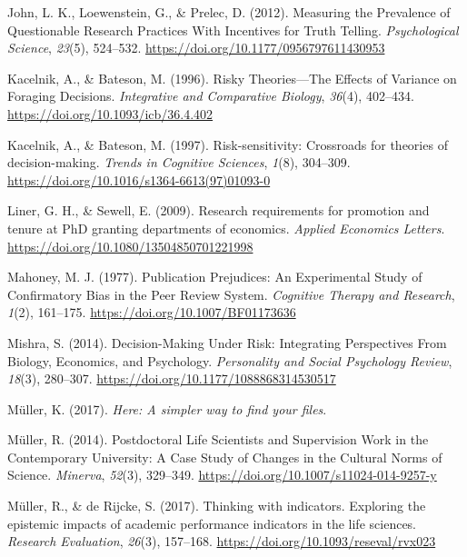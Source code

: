 \documentclass[
  ,man,mask,floatsintext]{apa6}
\newlength{\cslhangindent}
\newlength{\cslentryspacingunit} %
\newenvironment{CSLReferences}[2] %
 {%
  \setlength{\parindent}{0pt}
  \ifodd #1
  \let\oldpar\par
  \def\par{\hangindent=\cslhangindent\oldpar}
  \fi
  \setlength{\parskip}{#2\cslentryspacingunit}
 }%
 {}
\begin{document}
\begin{CSLReferences}{1}{0}
\leavevmode{}%
John, L. K., Loewenstein, G., \& Prelec, D. (2012). Measuring the {Prevalence} of {Questionable Research Practices With Incentives} for {Truth Telling}. \emph{Psychological Science}, \emph{23}(5), 524--532. \url{https://doi.org/10.1177/0956797611430953}

\leavevmode{}%
Kacelnik, A., \& Bateson, M. (1996). Risky {Theories}---{The Effects} of {Variance} on {Foraging Decisions}. \emph{Integrative and Comparative Biology}, \emph{36}(4), 402--434. \url{https://doi.org/10.1093/icb/36.4.402}

\leavevmode{}%
Kacelnik, A., \& Bateson, M. (1997). Risk-sensitivity: Crossroads for theories of decision-making. \emph{Trends in Cognitive Sciences}, \emph{1}(8), 304--309. \url{https://doi.org/10.1016/s1364-6613(97)01093-0}

\leavevmode{}%
Liner, G. H., \& Sewell, E. (2009). Research requirements for promotion and tenure at {PhD} granting departments of economics. \emph{Applied Economics Letters}. \url{https://doi.org/10.1080/13504850701221998}

\leavevmode{}%
Mahoney, M. J. (1977). Publication {Prejudices}: {An Experimental Study} of {Confirmatory Bias} in the {Peer Review System}. \emph{Cognitive Therapy and Research}, \emph{1}(2), 161--175. \url{https://doi.org/10.1007/BF01173636}

\leavevmode{}%
Mishra, S. (2014). Decision-{Making Under Risk}: {Integrating Perspectives From Biology}, {Economics}, and {Psychology}. \emph{Personality and Social Psychology Review}, \emph{18}(3), 280--307. \url{https://doi.org/10.1177/1088868314530517}

\leavevmode{}%
Müller, K. (2017). \emph{Here: {A} simpler way to find your files}.

\leavevmode{}%
Müller, R. (2014). Postdoctoral {Life Scientists} and {Supervision Work} in the {Contemporary University}: {A Case Study} of {Changes} in the {Cultural Norms} of {Science}. \emph{Minerva}, \emph{52}(3), 329--349. \url{https://doi.org/10.1007/s11024-014-9257-y}

\leavevmode{}%
Müller, R., \& de Rijcke, S. (2017). Thinking with indicators. {Exploring} the epistemic impacts of academic performance indicators in the life sciences. \emph{Research Evaluation}, \emph{26}(3), 157--168. \url{https://doi.org/10.1093/reseval/rvx023}


\end{CSLReferences}
\end{document}
